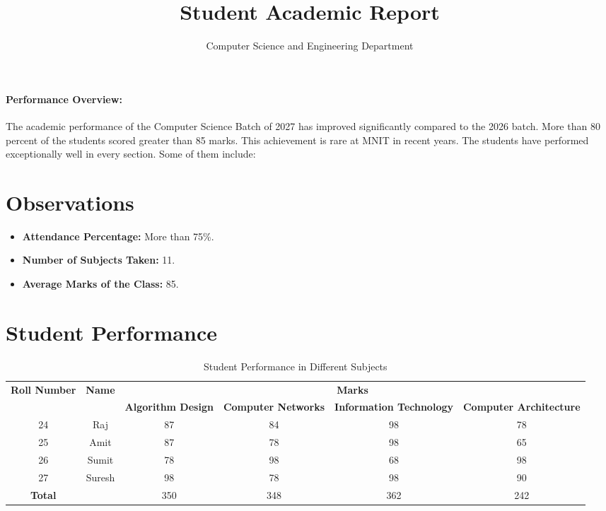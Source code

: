 \documentclass[a4paper,12pt]{article}
\title{\Large \textbf{Student Academic Report}}
\author{Computer Science and Engineering Department}
\date{}  %
\begin{document}
	
	\maketitle
	
	\paragraph*{Performance Overview:} 
	The academic performance of the Computer Science Batch of 2027 has improved significantly compared to the 2026 batch. More than 80 percent of the students scored greater than 85 marks. This achievement is rare at MNIT in recent years. The students have performed exceptionally well in every section. Some of them include:
	
	\section*{Observations}
	\begin{itemize}
		\item \textbf{Attendance Percentage:} More than 75\%.
		\item \textbf{Number of Subjects Taken:} 11.
		\item \textbf{Average Marks of the Class:} 85.
	\end{itemize}
	
	\section*{Student Performance}
	\begin{table}[h]
		\centering
		\small  %
		\begin{tabular}{|c|c|c|c|c|c|}
			\hline
			\multirow{2}{*}{\textbf{Roll Number}} & \multirow{2}{*}{\textbf{Name}} & \multicolumn{4}{|c|}{\textbf{Marks}} \\
			\cline{3-6}
			&  & \textbf{Algorithm Design} & \textbf{Computer Networks} & \textbf{Information Technology} & \textbf{Computer Architecture} \\
			\hline
			24 & Raj & 87 & 84 & 98 & 78 \\
			\hline
			25 & Amit & 87 & 78 & 98 & 65 \\
			\hline
			26 & Sumit & 78 & 98 & 68 & 98 \\
			\hline
			27 & Suresh & 98 & 78 & 98 & 90 \\
			\hline
			\textbf{Total} & & 350 & 348 & 362 & 242 \\
			\hline
		\end{tabular}
		\caption{Student Performance in Different Subjects}
	\end{table}
	
\end{document}
